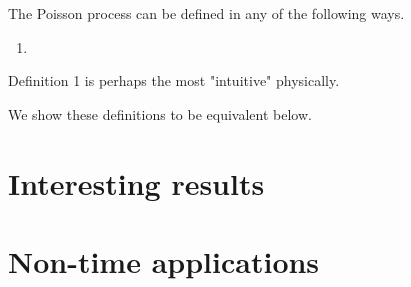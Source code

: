 \documentclass{article}
\begin{document}
The Poisson process can be defined in any of the following ways.

\begin{enumerate}
\item 
\end{enumerate}


Definition 1 is perhaps the most "intuitive" physically. 

We show these definitions to be equivalent below. 


\section{Interesting results}


\section{Non-time applications}
\end{document}
